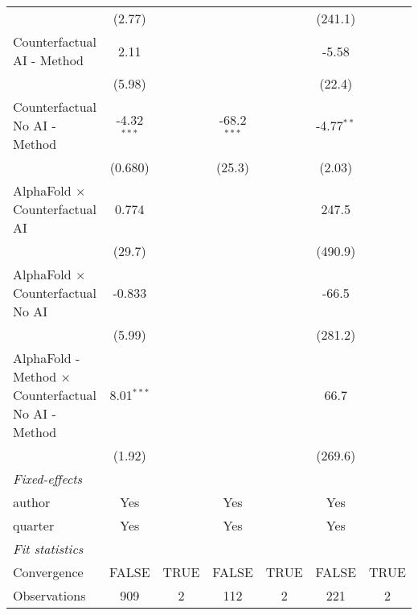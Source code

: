 \begin{tabular}{lcccccc}
                                                              & (2.77)        &      &                &      & (241.1)      &   \\   
   Counterfactual AI - Method                                 & 2.11          &      &                &      & -5.58        &   \\   
                                                              & (5.98)        &      &                &      & (22.4)       &   \\   
   Counterfactual No AI - Method                              & -4.32$^{***}$ &      & -68.2$^{***}$  &      & -4.77$^{**}$ &   \\   
                                                              & (0.680)       &      & (25.3)         &      & (2.03)       &   \\   
   AlphaFold $\times$ Counterfactual AI                       & 0.774         &      &                &      & 247.5        &   \\   
                                                              & (29.7)        &      &                &      & (490.9)      &   \\   
   AlphaFold $\times$ Counterfactual No AI                    & -0.833        &      &                &      & -66.5        &   \\   
                                                              & (5.99)        &      &                &      & (281.2)      &   \\   
   AlphaFold - Method $\times$ Counterfactual No AI - Method  & 8.01$^{***}$  &      &                &      & 66.7         &   \\   
                                                              & (1.92)        &      &                &      & (269.6)      &   \\   
   \midrule
   \emph{Fixed-effects}\\
   author                                                     & Yes           &      & Yes            &      & Yes          & \\  
   quarter                                                    & Yes           &      & Yes            &      & Yes          & \\  
   \midrule
   \emph{Fit statistics}\\
   Convergence                                                &FALSE          & TRUE & FALSE          & TRUE & FALSE        & TRUE\\  
   Observations                                               & 909           & 2    & 112            & 2    & 221          & 2\\  

\end{tabular}
